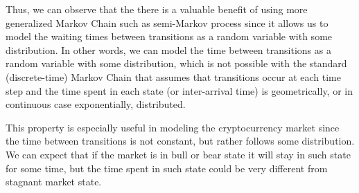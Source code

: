 Thus, we can observe that the there is a valuable benefit of using more generalized Markov Chain such as semi-Markov process since it allows us to model the waiting times between transitions
as a random variable with some distribution. In other words, we can model the time between transitions as a random variable with some distribution, which is not possible with the standard (discrete-time) Markov Chain that
assumes that transitions occur at each time step and the time spent in each state (or inter-arrival time) is geometrically, or in continuous case exponentially, distributed. 

This property is especially useful in modeling the cryptocurrency market since the time between transitions is not constant, but rather follows some distribution. We can expect that 
if the market is in bull or bear state it will stay in such state for some time, but the time spent in such state could be very different from stagnant market state. 




